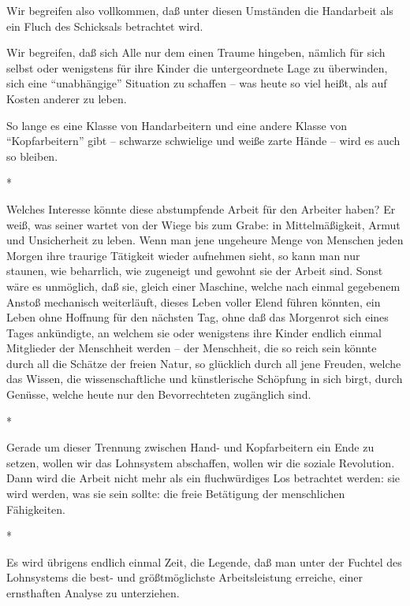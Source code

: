 \documentclass{scrbook}
\begin{document}
Wir begreifen also vollkommen, daß unter diesen Umständen die Handarbeit als ein Fluch des Schicksals betrachtet wird.

Wir begreifen, daß sich Alle nur dem einen Traume hingeben, nämlich für sich selbst oder wenigstens für ihre Kinder die untergeordnete Lage zu überwinden, sich eine ``unabhängige'' Situation zu schaffen – was heute so viel heißt, als auf Kosten anderer zu leben.

So lange es eine Klasse von Handarbeitern und eine andere Klasse von ``Kopfarbeitern'' gibt – schwarze schwielige und weiße zarte Hände – wird es auch so bleiben.

\begin{center}*\end{center}

Welches Interesse könnte diese abstumpfende Arbeit für den Arbeiter haben? Er weiß, was seiner wartet von der Wiege bis zum Grabe: in Mittelmäßigkeit, Armut und Unsicherheit zu leben. Wenn man jene ungeheure Menge von Menschen jeden Morgen ihre traurige Tätigkeit wieder aufnehmen sieht, so kann man nur staunen, wie beharrlich, wie zugeneigt und gewohnt sie der Arbeit sind. Sonst wäre es unmöglich, daß sie, gleich einer Maschine, welche nach einmal gegebenem Anstoß mechanisch weiterläuft, dieses Leben voller Elend führen könnten, ein Leben ohne Hoffnung für den nächsten Tag, ohne daß das Morgenrot sich eines Tages ankündigte, an welchem sie oder wenigstens ihre Kinder endlich einmal Mitglieder der Menschheit werden – der Menschheit, die so reich sein könnte durch all die Schätze der freien Natur, so glücklich durch all jene Freuden, welche das Wissen, die wissenschaftliche und künstlerische Schöpfung in sich birgt, durch Genüsse, welche heute nur den Bevorrechteten zugänglich sind.

\begin{center}*\end{center}

Gerade um dieser Trennung zwischen Hand- und Kopfarbeitern ein Ende zu setzen, wollen wir das Lohnsystem abschaffen, wollen wir die soziale Revolution. Dann wird die Arbeit nicht mehr als ein fluchwürdiges Los betrachtet werden: sie wird werden, was sie sein sollte: die freie Betätigung der menschlichen Fähigkeiten.

\begin{center}*\end{center}

Es wird übrigens endlich einmal Zeit, die Legende, daß man unter der Fuchtel des Lohnsystems die best- und größtmöglichste Arbeitsleistung erreiche, einer ernsthaften Analyse zu unterziehen.
\end{document}
